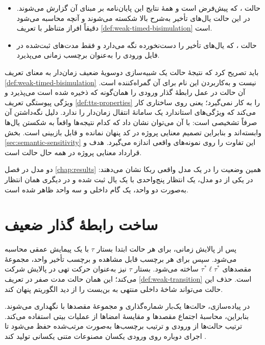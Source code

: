\begin{itemize}
\item حالت ، که پیش‌فرض است و همهٔ نتایج این پایان‌نامه بر مبنای آن گزارش می‌شوند. در این حالت یال‌های تأخیر به‌شرح بالا شکسته می‌شوند و آنچه محاسبه می‌شود دقیقاً افراز متناظر با تعریف \ref{def:weak-timed-bisimulation} است.
\item حالت ، که یال‌های تأخیر را دست‌نخورده نگه می‌دارد و فقط مدت‌های ثبت‌شده در فایل ورودی را به‌عنوان برچسب زمانی می‌پذیرد.
\end{itemize}

باید تصریح کرد که نتیجهٔ حالت  یک شبیه‌سازی دوسویهٔ ضعیف زمان‌دار به معنای تعریف \ref{def:weak-timed-bisimulation} نیست و به‌کاربردن این نام برای آن گمراه‌کننده است. آن حالت در عمل رابطهٔ گذار ورودی را همان‌گونه که ذخیره شده است می‌پذیرد و ویژگی پیوستگی تعریف \ref{def:tts-properties} را به کار نمی‌گیرد؛ یعنی روی ساختاری کار می‌کند که ویژگی‌های استاندارد یک سامانهٔ انتقال زمان‌دار را ندارد. دلیل نگه‌داشتن آن صرفاً تشخیصی است: با آن می‌توان نشان داد که کدام نتیجه‌ها واقعاً به شکستن یال‌ها وابسته‌اند و بنابراین تصمیم معنایی پروژه در کد پنهان نمانده و قابل بازبینی است. بخش \ref{sec:semantic-sensitivity} این تفاوت را روی نمونه‌های واقعی اندازه می‌گیرد. هدف و قرارداد معنایی پروژه در همه حال حالت  است.

دو مدل  در فصل \ref{chap:results} همین وضعیت را در یک مدل واقعی ربکا نشان می‌دهند: در یکی از دو مدل، یک انتظار پنج‌واحدی با یک یال ثبت شده و در دیگری همان انتظار به‌صورت دو واحد، یک گام داخلی و سه واحد ظاهر شده است.


\section{ساخت رابطهٔ گذار ضعیف}

پس از پالایش زمانی، برای هر حالت ابتدا بستار $\tau$ با یک پیمایش عمقی محاسبه می‌شود. سپس برای هر برچسب قابل مشاهده و برچسب تأخیر واحد، مجموعهٔ مقصدهای $\tau^*\ell\tau^*$ ساخته می‌شود. بستار $\tau$ نیز به‌عنوان حرکت تهی در پالایش شرکت می‌کند؛ این همان حالت مدت صفر در تعریف \ref{def:weak-transition} است. حذف این حالت می‌تواند شاخهٔ داخلی منتهی به بن‌بست را از دید الگوریتم پنهان کند.

در پیاده‌سازی، حالت‌ها یک‌بار شماره‌گذاری و مجموعهٔ مقصدها با  نگهداری می‌شوند. بنابراین، محاسبهٔ اجتماع مقصدها و مقایسهٔ امضاها از عملیات بیتی استفاده می‌کند. ترتیب حالت‌ها از ورودی و ترتیب برچسب‌ها به‌صورت مرتب‌شده حفظ می‌شود تا اجرای دوباره روی ورودی یکسان مصنوعات متنی یکسانی تولید کند \cite{AfraWeakTimedReduction2026}.


